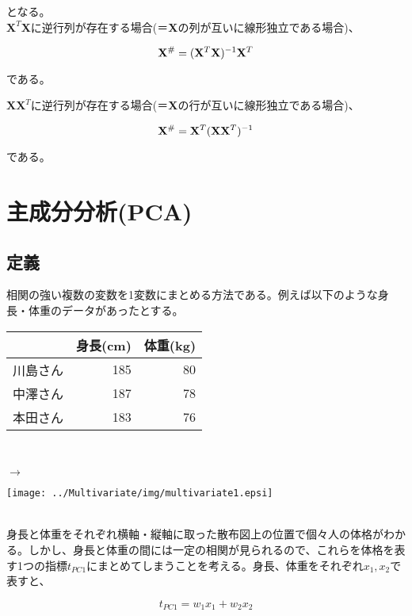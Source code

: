 となる。\\

\({\mathbf X}^T{\mathbf X}\)に逆行列が存在する場合(＝{\bf X}の列が互いに線形独立である場合)、

\[ {\mathbf X}^{\#} = ({\bf X}^T{\bf X})^{-1}{\bf X}^T \]

である。

\({\mathbf X}{\mathbf X}^T\)に逆行列が存在する場合(＝{\bf X}の行が互いに線形独立である場合)、

\[ {\mathbf X}^{\#} = {\bf X}^T ({\bf X}{\bf X}^T)^{-1}\]

である。




\section{主成分分析(PCA)}
\subsection{定義}
相関の強い複数の変数を1変数にまとめる方法である。例えば以下のような身長・体重のデータがあったとする。\\
\begin{minipage}{185pt}

\begin{tabular}{l|rr}
\hline
 & 身長(cm) & 体重(kg) \\
\hline
川島さん & 185 & 80 \\
中澤さん & 187 & 78 \\
本田さん & 183 & 76 \\
\hline
\end{tabular}\\
\end{minipage}
\(\longrightarrow\)
\begin{minipage}{200pt}
\begin{center}
\texttt{[image: ../Multivariate/img/multivariate1.epsi]}
\end{center}
\end{minipage}\\

身長と体重をそれぞれ横軸・縦軸に取った散布図上の位置で個々人の体格がわかる。しかし、身長と体重の間には一定の相関が見られるので、これらを体格を表す1つの指標\(t_{PC1}\)にまとめてしまうことを考える。身長、体重をそれぞれ\(x_1, x_2\)で表すと、

\[t_{PC1} = w_1 x_1 + w_2 x_2\]

